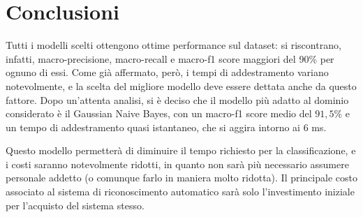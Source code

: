 \section{Conclusioni}
Tutti i modelli scelti ottengono ottime performance sul dataset: si riscontrano,
infatti, macro-precisione, macro-recall e macro-f1 score maggiori del 90\% 
per ognuno di essi.
Come già affermato, però, i tempi di addestramento variano notevolmente,
e la scelta del migliore modello deve essere dettata anche da questo fattore.
Dopo un'attenta analisi, si è deciso che il modello più adatto al dominio considerato
è il Gaussian Naive Bayes, con un macro-f1 score medio del $91,5\%$
e un tempo di addestramento quasi istantaneo, che si aggira intorno ai 6 ms. 

Questo modello permetterà di diminuire il tempo richiesto per la classificazione,
e i costi saranno notevolmente ridotti, in quanto non sarà più necessario assumere
personale addetto (o comunque farlo in maniera molto ridotta).
Il principale costo associato al sistema di riconoscimento automatico sarà
solo l'investimento iniziale per l'acquisto del sistema stesso.